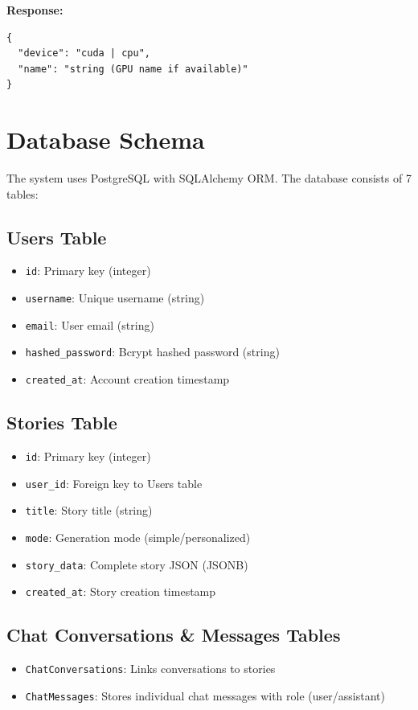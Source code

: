 \textbf{Response:}
\begin{verbatim}
{
  "device": "cuda | cpu",
  "name": "string (GPU name if available)"
}
\end{verbatim}

\section{Database Schema}

The system uses PostgreSQL with SQLAlchemy ORM. The database consists of 7 tables:

\subsection{Users Table}
\begin{itemize}
    \item \texttt{id}: Primary key (integer)
    \item \texttt{username}: Unique username (string)
    \item \texttt{email}: User email (string)
    \item \texttt{hashed\_password}: Bcrypt hashed password (string)
    \item \texttt{created\_at}: Account creation timestamp
\end{itemize}

\subsection{Stories Table}
\begin{itemize}
    \item \texttt{id}: Primary key (integer)
    \item \texttt{user\_id}: Foreign key to Users table
    \item \texttt{title}: Story title (string)
    \item \texttt{mode}: Generation mode (simple/personalized)
    \item \texttt{story\_data}: Complete story JSON (JSONB)
    \item \texttt{created\_at}: Story creation timestamp
\end{itemize}

\subsection{Chat Conversations \& Messages Tables}
\begin{itemize}
    \item \texttt{ChatConversations}: Links conversations to stories
    \item \texttt{ChatMessages}: Stores individual chat messages with role (user/assistant)
\end{itemize}

